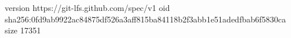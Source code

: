 version https://git-lfs.github.com/spec/v1
oid sha256:0fd9ab9922ac84875df526a3aff815ba84118b2f3abb1e51adedfbab6f5830ca
size 17351
